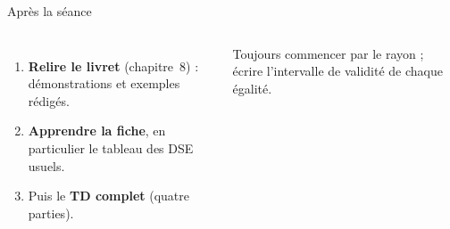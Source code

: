 \documentclass[aspectratio=169,10pt]{beamer}
\begin{document}
\begin{frame}{Après la séance}
\begin{columns}[T]
\begin{enumerate}
\item \textbf{Relire le livret} (chapitre~8) : démonstrations et exemples rédigés.
\item \textbf{Apprendre la fiche}, en particulier le tableau des DSE usuels.
\item Puis le \textbf{TD complet} (quatre parties).
\end{enumerate}
\begin{ASTU}
Toujours commencer par le rayon ; écrire l'intervalle de validité de chaque égalité.
\end{ASTU}
\end{columns}
\end{frame}
\end{document}
